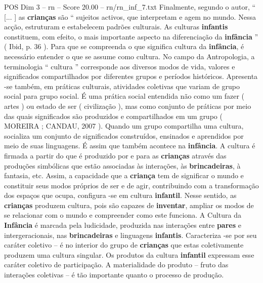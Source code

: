 \begin{textsample}{POS Dim 3 – rn – Score 20.00 – rn/rn\_inf\_7.txt}
Finalmente, segundo o autor, “ [... ] as \textbf{crianças} são “ sujeitos activos, que interpretam e agem no mundo.
Nessa acção, estruturam e estabelecem padrões culturais.
As culturas \textbf{infantis} constituem, com efeito, o mais importante aspecto na diferenciação da \textbf{infância} ” ( Ibid, p. 36 ).
Para que se compreenda o que significa cultura da \textbf{infância}, é necessário entender o que se assume como cultura.
No campo da Antropologia, a terminologia “ cultura ” corresponde aos diversos modos de vida, valores e significados compartilhados por diferentes grupos e períodos históricos.
Apresenta -se também, em práticas culturais, atividades coletivas que variam de grupo social para grupo social.
É uma prática social entendida não como um fazer ( artes ) ou estado de ser ( civilização ), mas como conjunto de práticas por meio das quais significados são produzidos e compartilhados em um grupo ( MOREIRA ; CANDAU, 2007 ).
Quando um grupo compartilha uma cultura, socializa um conjunto de significados construídos, ensinados e aprendidos por meio de suas linguagens.
É assim que também acontece na \textbf{infância}.
A cultura é firmada a partir do que é produzido por e para as \textbf{crianças} através das produções simbólicas que estão associadas às interações, às \textbf{brincadeiras}, à fantasia, etc.
Assim, a capacidade que a \textbf{criança} tem de significar o mundo e constituir seus modos próprios de ser e de agir, contribuindo com a transformação dos espaços que ocupa, configura -se em cultura \textbf{infantil}.
Nesse sentido, as \textbf{crianças} produzem cultura, pois são capazes de \textbf{inventar}, ampliar os modos de se relacionar com o mundo e compreender como este funciona.
A Cultura da \textbf{Infância} é marcada pela ludicidade, produzida nas interações entre \textbf{pares} e intergeracionais, nas \textbf{brincadeiras} e linguagens \textbf{infantis}.
Caracteriza -se por seu caráter coletivo – é no interior do grupo de \textbf{crianças} que estas coletivamente produzem uma cultura singular.
Os produtos da cultura \textbf{infantil} expressam esse caráter coletivo de participação.
A materialidade do produto – fruto das interações coletivas – é tão importante quanto o processo de produção.

\end{textsample}
